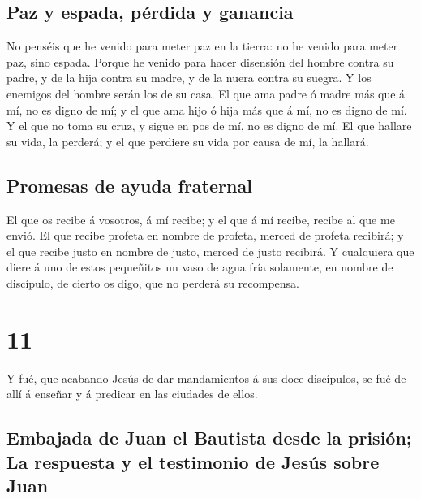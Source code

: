 \hypertarget{paz-y-espada-puxe9rdida-y-ganancia}{%
\subsection{Paz y espada, pérdida y
ganancia}\label{paz-y-espada-puxe9rdida-y-ganancia}}

 No penséis que he venido para meter paz en la tierra: no
he venido para meter paz, sino espada.  Porque he venido
para hacer disensión del hombre contra su padre, y de la hija contra su
madre, y de la nuera contra su suegra.  Y los enemigos del
hombre serán los de su casa.  El que ama padre ó madre más
que á mí, no es digno de mí; y el que ama hijo ó hija más que á mí, no
es digno de mí.  Y el que no toma su cruz, y sigue en pos
de mí, no es digno de mí.  El que hallare su vida, la
perderá; y el que perdiere su vida por causa de mí, la hallará.

\hypertarget{promesas-de-ayuda-fraternal}{%
\subsection{Promesas de ayuda
fraternal}\label{promesas-de-ayuda-fraternal}}

 El que os recibe á vosotros, á mí recibe; y el que á mí
recibe, recibe al que me envió.  El que recibe profeta en
nombre de profeta, merced de profeta recibirá; y el que recibe justo en
nombre de justo, merced de justo recibirá.  Y cualquiera
que diere á uno de estos pequeñitos un vaso de agua fría solamente, en
nombre de discípulo, de cierto os digo, que no perderá su recompensa.

\hypertarget{section-10}{%
\section{11}\label{section-10}}

 Y fué, que acabando Jesús de dar mandamientos á sus doce
discípulos, se fué de allí á enseñar y á predicar en las ciudades de
ellos.

\hypertarget{embajada-de-juan-el-bautista-desde-la-prisiuxf3n-la-respuesta-y-el-testimonio-de-jesuxfas-sobre-juan}{%
\subsection{Embajada de Juan el Bautista desde la prisión; La respuesta
y el testimonio de Jesús sobre
Juan}\label{embajada-de-juan-el-bautista-desde-la-prisiuxf3n-la-respuesta-y-el-testimonio-de-jesuxfas-sobre-juan}}

